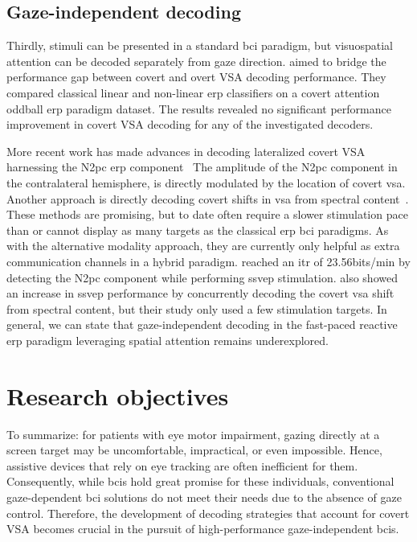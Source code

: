 \subsection{Gaze-independent decoding}
Thirdly, stimuli can be presented in a standard \ac{bci} paradigm, but visuospatial
attention can be decoded separately from gaze direction.
\textcite{Aloise2012} aimed to bridge the performance gap between covert and
overt VSA decoding performance.
They compared classical linear and non-linear \ac{erp} classifiers on a covert
attention oddball \ac{erp} paradigm dataset.
The results revealed no significant performance improvement in covert VSA
decoding for any of the investigated decoders.

More recent work has made advances in decoding lateralized covert
VSA harnessing the N2pc \ac{erp}
component~\cite{Thiery2016,Reichert2020b,Wang2022}
The amplitude of the N2pc component in the contralateral hemisphere, is directly modulated
by the location of covert \ac{vsa}.
Another approach is directly decoding covert shifts in \ac{vsa} from spectral
content~\cite{Tonin2013}.
These methods are promising, but to date often require a slower stimulation pace than or cannot display as
many targets as the classical \ac{erp} \ac{bci} paradigms.
As with the alternative modality approach, they are currently only helpful as
extra communication channels in a hybrid paradigm.
\textcite{Xu2016} reached an \ac{itr} of 23.56bits/min by detecting the N2pc
component while performing \ac{ssvep} stimulation.
\textcite{Egan2017} also showed an increase in \ac{ssvep} performance by
concurrently decoding the covert \ac{vsa} shift from spectral content, but
their study only used a few stimulation targets.
In general, we can state that gaze-independent decoding in the fast-paced reactive \ac{erp} paradigm
leveraging spatial attention remains underexplored.

\section{Research objectives}

To summarize: for patients with eye motor impairment, gazing directly at a screen target may
be uncomfortable, impractical, or even impossible.
Hence, assistive devices that rely on eye tracking are often inefficient for
them.
Consequently, while \ac{bci}s hold great promise for these individuals, conventional
gaze-dependent \ac{bci} solutions do not meet their needs due to the absence of gaze
control.
Therefore, the development of decoding strategies that account for covert
VSA becomes crucial in the pursuit of high-performance gaze-independent
\ac{bci}s.


